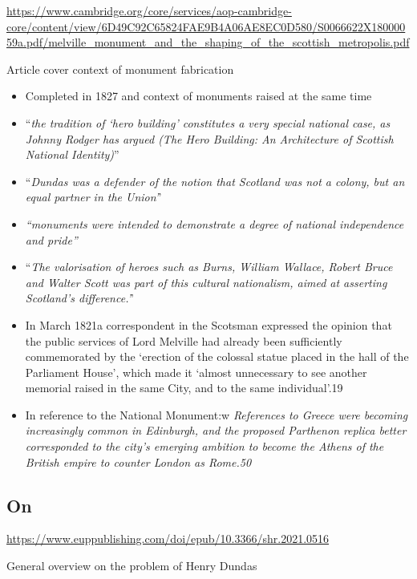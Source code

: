 \url{https://www.cambridge.org/core/services/aop-cambridge-core/content/view/6D49C92C65824FAE9B4A06AE8EC0D580/S0066622X18000059a.pdf/melville_monument_and_the_shaping_of_the_scottish_metropolis.pdf}

Article cover context of monument fabrication
\begin{itemize}
    \item Completed in 1827 and context of monuments raised at the same time
    \item ``\textit{the tradition of ‘hero building’ constitutes a very special national case, as Johnny Rodger has argued (The Hero Building: An Architecture of Scottish National Identity)}''
    \item ``\textit{Dundas was a defender of the notion that Scotland was not a colony, but an equal partner in the Union'}'
    \item \textit{``monuments were intended to demonstrate a degree of national independence and pride''}
    \item ``\textit{The valorisation of heroes such as Burns, William Wallace, Robert Bruce and Walter Scott was part of this cultural nationalism, aimed at asserting Scotland’s difference.'}'
    \item In March 1821a correspondent in the Scotsman expressed the opinion that the public services of Lord Melville had already been sufficiently commemorated by the ‘erection of the colossal statue placed in the hall of the Parliament House’, which made it ‘almost unnecessary to see another memorial raised in the same City, and to the same individual’.19 
    \item In reference to the National Monument:w \textit{References to Greece were becoming increasingly common in Edinburgh, and the proposed Parthenon replica better corresponded to the city’s emerging ambition to become the Athens of the British empire to counter London as Rome.50}
\end{itemize}

\subsection{On \cite{mullen_2021}}

\url{https://www.euppublishing.com/doi/epub/10.3366/shr.2021.0516}

General overview on the problem of Henry Dundas
 
